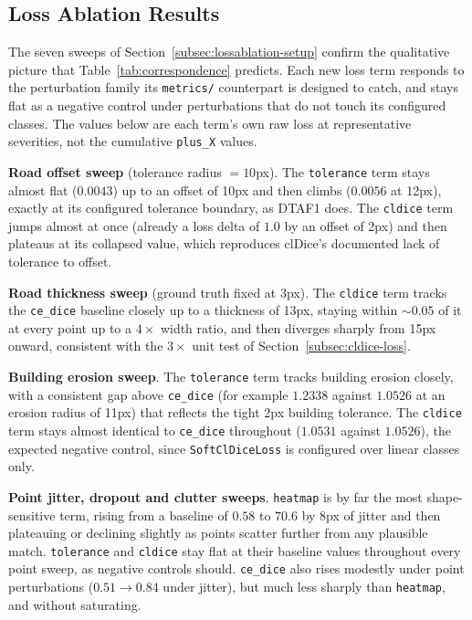 \subsection{Loss Ablation Results}
\label{subsec:lossablation-results}

The seven sweeps of Section~\ref{subsec:lossablation-setup} confirm the qualitative picture that
Table~\ref{tab:correspondence} predicts. Each new loss term responds to the perturbation family its
\texttt{metrics/} counterpart is designed to catch, and stays flat as a negative control under
perturbations that do not touch its configured classes. The values below are each term's own raw
loss at representative severities, not the cumulative \texttt{plus\_X} values.

\textbf{Road offset sweep} (tolerance radius $=10$px). The \texttt{tolerance} term stays almost flat
($0.0043$) up to an offset of 10px and then climbs ($0.0056$ at 12px), exactly at its configured
tolerance boundary, as DTAF1 does. The \texttt{cldice} term jumps almost at once (already a loss delta of
$1.0$ by an offset of 2px) and then plateaus at its collapsed value, which reproduces clDice's
documented lack of tolerance to offset.

\textbf{Road thickness sweep} (ground truth fixed at 3px). The \texttt{cldice} term tracks the
\texttt{ce\_dice} baseline closely up to a thickness of 13px, staying within ${\sim}0.05$ of it at
every point up to a $4\times$ width ratio, and then diverges sharply from 15px onward, consistent
with the $3\times$ unit test of Section~\ref{subsec:cldice-loss}.

\textbf{Building erosion sweep}. The \texttt{tolerance} term tracks building erosion closely, with
a consistent gap above \texttt{ce\_dice} (for example $1.2338$ against $1.0526$ at an erosion radius
of 11px) that reflects the tight 2px building tolerance. The \texttt{cldice} term stays almost
identical to \texttt{ce\_dice} throughout ($1.0531$ against $1.0526$), the expected negative control,
since \texttt{SoftClDiceLoss} is configured over linear classes only.

\textbf{Point jitter, dropout and clutter sweeps}. \texttt{heatmap} is by far the most
shape-sensitive term, rising from a baseline of $0.58$ to $70.6$ by 8px of jitter and then
plateauing or declining slightly as points scatter further from any plausible match.
\texttt{tolerance} and \texttt{cldice} stay flat at their baseline values throughout every point
sweep, as negative controls should. \texttt{ce\_dice} also rises modestly under point perturbations
($0.51 \to 0.84$ under jitter), but much less sharply than \texttt{heatmap}, and without
saturating.

